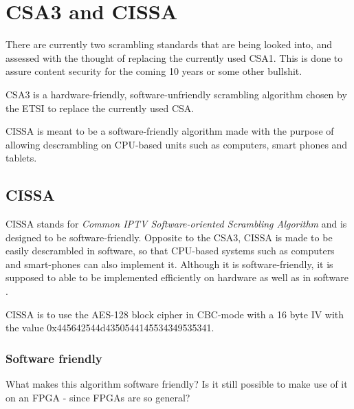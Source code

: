 \chapter{CSA3 and CISSA}
There are currently two scrambling standards that are being  looked into, and assessed with the thought of replacing the currently used CSA1. This is done to assure content security for the coming 10 years or some other bullshit.

CSA3 is a hardware-friendly, software-unfriendly scrambling algorithm chosen by 
the ETSI to replace the currently used CSA. \citep[pp. 6--7]{DVB:2013}

CISSA is meant to be a software-friendly algorithm made with the purpose of 
allowing descrambling on CPU-based units such as computers, smart phones and 
tablets. \citep[p. 9]{DVB:2013}

\section{CISSA}
CISSA stands for \emph{Common IPTV Software-oriented Scrambling Algorithm} and 
is designed to be software-friendly. Opposite to the CSA3, CISSA is made to be 
easily descrambled in software, so that CPU-based systems such as computers and 
smart-phones can also implement it.  Although it is software-friendly, it is 
supposed to able to be implemented efficiently on hardware as well as in 
software \citep[p. 9]{DVB:2013}.

CISSA is to use the AES-128 block cipher in CBC-mode with a 16 byte IV with the 
value 0x445642544d4350544145534349535341.



\subsection{Software friendly}
What makes this algorithm software friendly?
Is it still possible to make use of it on an FPGA - since FPGAs are so
general?

